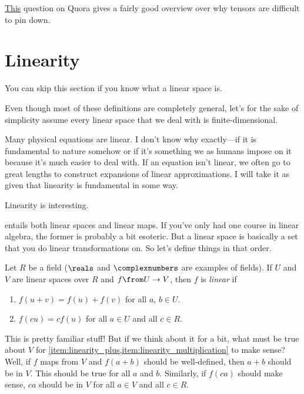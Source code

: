 \href{https://www.quora.com/Why-is-it-difficult-to-explain-tensors?}{\color{blue}This} question on Quora gives a fairly good overview over why tensors are difficult to pin down.

\section{Linearity}%
\label{sec:linearity}

You can skip this section if you know what a linear space is.

Even though most of these definitions are completely general, let's for the sake of simplicity assume every linear space that we deal with is finite-dimensional.

Many physical equations are linear.
I don't know why exactly---if it is fundamental to nature somehow or if it's something we as humans impose on it because it's much easier to deal with.
If an equation isn't linear, we often go to great lengths to construct expansions of linear approximations.
I will take it as given that linearity is fundamental in some way.
\begin{axiom}\label{ax:linearity}
	Linearity is interesting.
\end{axiom}
 entails both linear spaces and linear maps.
If you've only had one course in linear algebra, the former is probably a bit esoteric.
But a linear space is basically a set that you do linear transformations on.
So let's define things in that order.
\begin{definition}\label{def:linear_map}
	Let $R$ be a field ($\reals$ and $\complexnumbers$ are examples of fields).
	If $U$ and $V$ are linear spaces over $R$ and $f \from U \to V$, then $f$ is \emph{linear} if
	\begin{enumerate}
		\item $f(u + v) = f(u) + f(v)$ for all $a$, $b \in U$.%
		\label{item:linearity_plus}
		\item $f(c u) = c f(u)$ for all $a \in U$ and all $c \in R$.%
		\label{item:linearity_multiplication}
	\end{enumerate}
\end{definition}
This is pretty familiar stuff!
But if we think about it for a bit, what must be true about $V$ for \cref{item:linearity_plus,item:linearity_multiplication} to make sense?
Well, if $f$ maps from $V$ and $f(a + b)$ should be well-defined, then $a + b$ should be in $V$.
This should be true for all $a$ and $b$.
Similarly, if $f(c a)$ should make sense, $c a$ should be in $V$ for all $a \in V$ and all $c \in R$.
